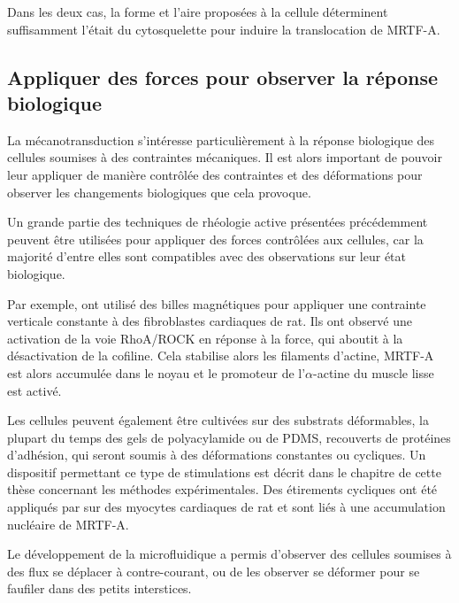 \documentclass{report}
\begin{document}
Dans les deux cas, la forme et l'aire proposées à la cellule déterminent suffisamment l'était du cytosquelette pour induire la translocation de MRTF-A.  

\subsection{Appliquer des forces pour observer la réponse biologique}

La mécanotransduction s'intéresse particulièrement à la réponse biologique des cellules soumises à des contraintes mécaniques. 
Il est alors important de pouvoir leur appliquer de manière contrôlée des contraintes et des déformations pour observer les changements biologiques que cela provoque. 

Un grande partie des techniques de rhéologie active présentées précédemment peuvent être utilisées pour appliquer des forces contrôlées aux cellules, car la majorité d'entre elles sont compatibles avec des observations sur leur état biologique.

Par exemple,\cite{zhao_force_2007} ont utilisé des billes magnétiques pour appliquer une contrainte verticale constante à des fibroblastes cardiaques de rat. Ils ont observé une activation de la voie RhoA/ROCK en réponse à la force, qui aboutit à la désactivation de la cofiline. Cela stabilise alors les filaments d'actine, MRTF-A est alors accumulée dans le noyau et le promoteur de l'$\alpha$-actine  du muscle lisse est activé. 

Les cellules peuvent également être cultivées sur des substrats déformables, la plupart du temps des gels de polyacylamide ou de PDMS, recouverts de protéines d'adhésion, qui seront soumis à des déformations constantes ou cycliques. Un dispositif permettant ce type de stimulations est décrit dans le chapitre de cette thèse concernant les méthodes expérimentales. 
Des étirements cycliques ont été appliqués par \cite{kuwahara_myocardin-related_2010} sur des myocytes cardiaques de rat et sont liés à une accumulation nucléaire de MRTF-A.  


Le développement de la microfluidique a permis d'observer des cellules soumises à des flux se déplacer à contre-courant, ou de les observer se déformer pour se faufiler dans des petits interstices. 
\end{document}
